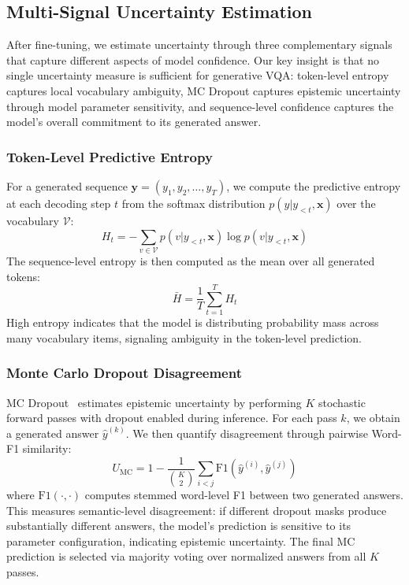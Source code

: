 \documentclass[pdflatex,sn-mathphys-num]{sn-jnl}
\begin{document}
\subsection{Multi-Signal Uncertainty Estimation}\label{subsec:uncertainty}

After fine-tuning, we estimate uncertainty through three complementary signals that capture different aspects of model confidence. Our key insight is that no single uncertainty measure is sufficient for generative VQA: token-level entropy captures local vocabulary ambiguity, MC Dropout captures epistemic uncertainty through model parameter sensitivity, and sequence-level confidence captures the model's overall commitment to its generated answer.

\subsubsection{Token-Level Predictive Entropy}

For a generated sequence $\mathbf{y} = (y_1, y_2, \ldots, y_T)$, we compute the predictive entropy at each decoding step $t$ from the softmax distribution $p(y|y_{<t}, \mathbf{x})$ over the vocabulary $\mathcal{V}$:
\begin{equation}
    H_t = -\sum_{v \in \mathcal{V}} p(v|y_{<t}, \mathbf{x}) \log p(v|y_{<t}, \mathbf{x})
\end{equation}
The sequence-level entropy is then computed as the mean over all generated tokens:
\begin{equation}
    \bar{H} = \frac{1}{T} \sum_{t=1}^{T} H_t
\end{equation}
High entropy indicates that the model is distributing probability mass across many vocabulary items, signaling ambiguity in the token-level prediction.

\subsubsection{Monte Carlo Dropout Disagreement}

MC Dropout~\cite{gal2016dropout} estimates epistemic uncertainty by performing $K$ stochastic forward passes with dropout enabled during inference. For each pass $k$, we obtain a generated answer $\hat{y}^{(k)}$. We then quantify disagreement through pairwise Word-F1 similarity:
\begin{equation}
    U_{\text{MC}} = 1 - \frac{1}{\binom{K}{2}} \sum_{i<j} \text{F1}(\hat{y}^{(i)}, \hat{y}^{(j)})
\end{equation}
where $\text{F1}(\cdot, \cdot)$ computes stemmed word-level F1 between two generated answers. This measures semantic-level disagreement: if different dropout masks produce substantially different answers, the model's prediction is sensitive to its parameter configuration, indicating epistemic uncertainty. The final MC prediction is selected via majority voting over normalized answers from all $K$ passes.
\end{document}
